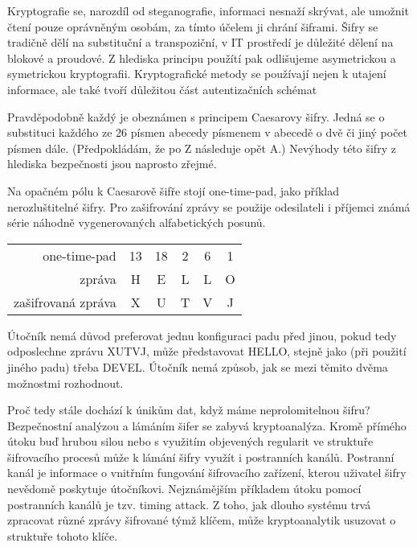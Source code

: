 \documentclass[12pt,draft]{article}
\begin{document}
Kryptografie se, narozdíl od steganografie, informaci nesnaží skrývat, ale umožnit čtení pouze oprávněným osobám, za tímto účelem ji chrání šiframi. Šifry se tradičně dělí na substituční a transpoziční, v IT prostředí je důležité dělení na blokové a proudové. Z hlediska principu použítí pak odlišujeme asymetrickou a symetrickou kryptografii. Kryptografické metody se používají nejen k utajení informace, ale také tvoří důležitou část autentizačních schémat



Pravděpodobně každý je obeznámen s principem Caesarovy šifry. Jedná se o substituci každého ze 26 písmen abecedy písmenem v abecedě o dvě či jiný počet písmen dále. (Předpokládám, že po Z následuje opět A.) Nevýhody této šifry z hlediska bezpečnosti jsou naprosto zřejmé.

Na opačném pólu k Caesarově šifře stojí \foreignlanguage{english}{one-time-pad}, jako příklad nerozluštitelné šifry. Pro zašifrování zprávy se použije odesilateli i příjemci známá série náhodně vygenerovaných alfabetických posunů.

\begin{table}[h]
\centering
\begin{tabular}{r||c|c|c|c|c}
one-time-pad & 13 & 18 & 2 & 6 & 1\\
zpráva & H & E & L & L & O\\\hline
zašifrovaná zpráva & X & U & T & V & J
\end{tabular}
\end{table}

Útočník nemá důvod preferovat jednu konfiguraci padu před jinou, pokud tedy odposlechne zprávu XUTVJ, může představovat HELLO, stejně jako (při použití jiného padu) třeba DEVEL. Útočník nemá způsob, jak se mezi těmito dvěma možnostmi rozhodnout.

Proč tedy stále dochází k únikům dat, když máme neprolomitelnou šifru? Bezpečnostní analýzou a lámáním šifer se zabyvá kryptoanalýza. Kromě přímého útoku buď hrubou silou nebo s využitím objevených regularit ve struktuře šifrovacího procesů může k lámání šifry využít i postranních kanálů. Postranní kanál je informace o vnitřním fungování šifrovacího zařízení, kterou uživatel šifry nevědomě poskytuje útočníkovi. Nejznámějším příkladem útoku pomocí postranních kanálů je tzv. timing attack. Z toho, jak dlouho systému trvá zpracovat různé zprávy šifrované týmž klíčem, může kryptoanalytik usuzovat o struktuře tohoto klíče.
\end{document}
